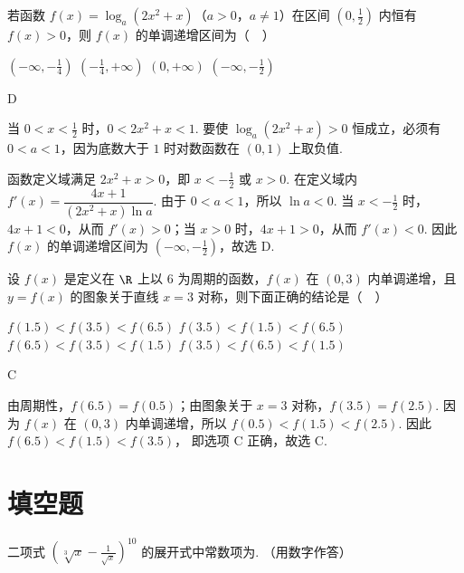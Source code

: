 \begin{problem}
若函数 \( f(x) = \log_a(2x^2 + x) \)（\(a > 0\)，\(a \neq 1\)）在区间 \( \left(0, \frac{1}{2}\right) \) 内恒有 \( f(x) > 0 \)，则 \( f(x) \) 的单调递增区间为（\(\quad\)）

\choices
    {\(\left(-\infty, -\frac{1}{4}\right)\)}
    {\(\left(-\frac{1}{4}, +\infty\right)\)}
    {\((0, +\infty)\)}
    {\(\left(-\infty, -\frac{1}{2}\right)\)}
\end{problem}

\begin{answer}
D
\end{answer}

\begin{solution}
当 \(0<x<\frac12\) 时，\(0<2x^2+x<1\). 要使
\(\log_a(2x^2+x)>0\) 恒成立，必须有 \(0<a<1\)，因为底数大于 \(1\) 时对数函数在 \((0,1)\) 上取负值.

函数定义域满足 \(2x^2+x>0\)，即 \(x<-\frac12\) 或 \(x>0\). 在定义域内 \(f'(x)=\dfrac{4x+1}{(2x^2+x)\ln a}\).
由于 \(0<a<1\)，所以 \(\ln a<0\). 当 \(x<-\frac12\) 时，\(4x+1<0\)，从而 \(f'(x)>0\)；当 \(x>0\) 时，\(4x+1>0\)，从而 \(f'(x)<0\). 因此 \(f(x)\) 的单调递增区间为 \(\left(-\infty,-\frac12\right)\)，故选 D.
\end{solution}

\begin{problem}
设 \( f(x) \) 是定义在 \( \R \) 上以 \(6\) 为周期的函数，\( f(x) \) 在 \( (0,3) \) 内单调递增，且 \( y = f(x) \) 的图象关于直线 \( x = 3 \) 对称，则下面正确的结论是（\(\quad\)）

\choices
    {\(f(1.5) < f(3.5) < f(6.5)\)}
    {\(f(3.5) < f(1.5) < f(6.5)\)}
    {\(f(6.5) < f(3.5) < f(1.5)\)}
    {\(f(3.5) < f(6.5) < f(1.5)\)}
\end{problem}

\begin{answer}
C
\end{answer}

\begin{solution}
由周期性，\(f(6.5)=f(0.5)\)；由图象关于 \(x=3\) 对称，\(f(3.5)=f(2.5)\). 因为 \(f(x)\) 在 \((0,3)\) 内单调递增，所以 \(f(0.5)<f(1.5)<f(2.5)\). 因此 \(f(6.5)<f(1.5)<f(3.5)\)，
即选项 C 正确，故选 C.
\end{solution}

\section{填空题}
\begin{problem}
二项式 \(\left(\sqrt[3]{x} - \frac{1}{\sqrt{x}}\right)^{10}\) 的展开式中常数项为\fillinblank{}. （用数字作答）
\end{problem}

